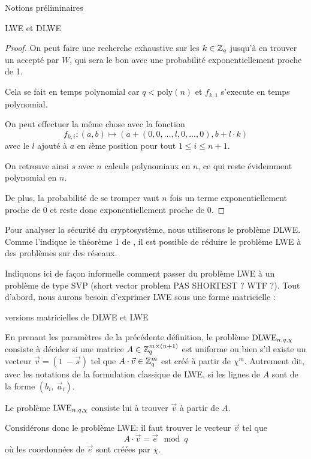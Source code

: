 \begin{section}{Notions préliminaires}
\begin{subsection}{LWE et DLWE}
\begin{proof}
	On peut faire une recherche exhaustive sur les $k \in \mathbb{Z}_q$ jusqu'à en trouver un accepté par $W$, qui sera le
	bon avec une probabilité exponentiellement proche de 1.
	
	Cela se fait en temps polynomial car $q < \text{poly}(n)$ et $f_{k,1}$ s'execute en temps polynomial.
	
	On peut effectuer la même chose avec la fonction
	\[f_{k,i}: (a,b) \mapsto (a + (0, 0, ..., l, 0, ..., 0), b + l \cdot k) \]
	avec le $l$ ajouté à $a$ en $i$ème position pour tout $1 \leqslant i \leqslant n+1$.
	
	On retrouve ainsi $s$ avec $n$ calculs polynomiaux en $n$, ce qui reste évidemment polynomial en $n$.
	
	De plus, la probabilité de se tromper vaut $n$ fois un terme exponentiellement proche de 0 et reste donc
	exponentiellement proche de 0.
	\end{proof}

	Pour analyser la sécurité du cryptosystème, nous utiliserons le problème DLWE. Comme l'indique le théorème 1 de
	\cite{C:GenSahWat13}, il est possible de réduire le problème LWE à des problèmes sur des réseaux.

	Indiquons ici de façon informelle comment passer du problème LWE à un problème de type SVP (short vector
	problem PAS SHORTEST ? WTF ?). Tout d'abord, nous aurons besoin d'exprimer LWE sous une forme matricielle :

	\begin{definition}{versions matricielles de DLWE et LWE}

	En prenant les paramètres de la précédente définition, le problème $\text{DLWE}_{n,q,\chi}$ consiste à décider si une matrice $A
	\in \mathbb{Z}_q^{m \times (n+1)}$ est uniforme ou bien s'il existe un vecteur $\vec{v} = (1\: -\!\vec{s})$ tel que $A
	\cdot \vec{v} \in \mathbb{Z}_q^{m}$ est créé à partir de $\chi^m$. Autrement dit, avec les notations de la formulation
	classique de LWE, si les lignes de $A$ sont de la forme $(b_i,\: \vec{a}_i)$.
	
	Le problème $\text{LWE}_{n,q,\chi}$ consiste lui à trouver $\vec{v}$ à partir de $A$.
	\end{definition}

	Considérons donc le problème LWE: il faut trouver le vecteur $\vec{v}$ tel que
	\[ A\cdot \vec{v} = \vec{e} \mod q \]
	où les coordonnées de $\vec{e}$ sont créées par $\chi$.


\end{subsection}
\end{section}
